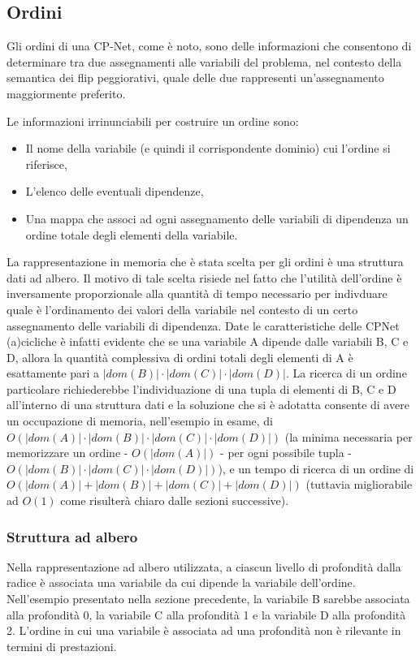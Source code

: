 \subsection{Ordini}
Gli ordini di una CP-Net, come è noto, sono delle informazioni che
consentono di determinare tra due assegnamenti alle variabili del
problema, nel contesto della semantica dei flip peggiorativi, quale
delle due rappresenti un'assegnamento maggiormente preferito.

Le informazioni irrinunciabili per costruire un ordine sono:
\begin{itemize}
\item Il nome della variabile (e quindi il corrispondente dominio) cui
  l'ordine si riferisce,
\item L'elenco delle eventuali dipendenze,
\item Una mappa che associ ad ogni assegnamento delle variabili di
  dipendenza un ordine totale degli elementi della variabile.
\end{itemize}

La rappresentazione in memoria che è stata scelta per gli ordini è una
struttura dati ad albero. Il motivo di tale scelta risiede nel fatto
che l'utilità dell'ordine è inversamente proporzionale alla quantità
di tempo necessario per indivduare quale è l'ordinamento dei valori
della variabile nel contesto di un certo assegnamento delle variabili
di dipendenza. Date le caratteristiche delle CPNet (a)cicliche è
infatti evidente che se una variabile A dipende dalle variabili B, C e
D, allora la quantità complessiva di ordini totali degli elementi di A
è esattamente pari a $ |dom(B)| \cdot |dom(C)| \cdot |dom(D)| $. La
ricerca di un ordine particolare richiederebbe l'individuazione di una
tupla di elementi di B, C e D all'interno di una struttura dati e la
soluzione che si è adotatta consente di avere un occupazione di
memoria, nell'esempio in esame, di $ O(|dom(A)| \cdot |dom(B)| \cdot
|dom(C)| \cdot |dom(D)|)$ (la minima necessaria per memorizzare un
ordine - $ O(|dom(A)|) $ - per ogni possibile tupla - $ O(|dom(B)|
\cdot |dom(C)| \cdot |dom(D)|)$), e un tempo di ricerca di un ordine
di $O(|dom(A)|+|dom(B)|+|dom(C)|+|dom(D)|)$ (tuttavia migliorabile ad
$O(1)$ come risulterà chiaro dalle sezioni successive).

\subsubsection{Struttura ad albero}
Nella rappresentazione ad albero utilizzata, a ciascun livello di
profondità dalla radice è associata una variabile da cui dipende la
variabile dell'ordine. Nell'esempio presentato nella sezione
precedente, la variabile B sarebbe associata alla profondità 0, la
variabile C alla profondità 1 e la variabile D alla profondità
2. L'ordine in cui una variabile è associata ad una profondità non è
rilevante in termini di prestazioni.

